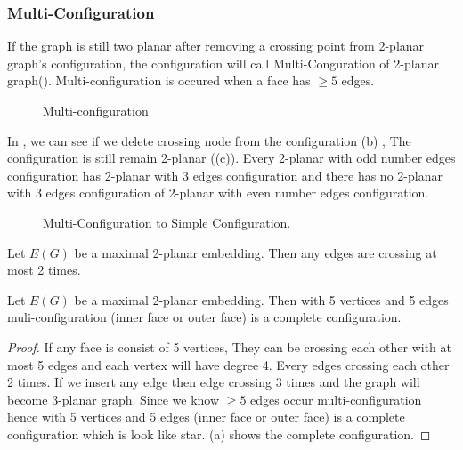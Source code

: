 \subsubsection{Multi-Configuration}
If the graph is still two planar after removing a crossing point from 2-planar graph's configuration, the configuration will call Multi-Conguration of 2-planar graph(). Multi-configuration is occured when a face has $\geq 5$ edges.

\begin{figure}[!tb]
\centering
\resizebox{100mm}{!}{}
\caption{Multi-configuration}
\label{fig:multiconfiguration}
\end{figure}

In  , we can see if we delete crossing node from the configuration (b) , The configuration is still remain 2-planar ((c)). 
Every 2-planar with odd number edges configuration has 2-planar with 3 edges configuration and there has no 2-planar with 3 edges configuration of 2-planar with even number edges configuration.
\begin{figure}[!tb]
\centering
\resizebox{100mm}{!}{}
\caption{Multi-Configuration to Simple Configuration.}
\label{fig:starmulti}
\end{figure}


\begin{lemma}

Let $E(G)$ be a maximal 2-planar embedding. Then any edges are crossing at most 2 times. 

\end{lemma}




\begin{lemma}

Let $E(G)$ be a maximal 2-planar embedding. Then with 5 vertices and 5 edges muli-configuration (inner face or outer face) is a complete configuration. 

\end{lemma}

\begin{proof}

If any face is consist of 5 vertices, They can be crossing each other with at most 5 edges and each vertex will have degree 4. Every edges crossing each other 2 times. If we insert any edge then edge crossing 3 times and the graph will become 3-planar graph. Since we know $\geq 5$ edges occur multi-configuration hence with 5 vertices and 5 edges (inner face or outer face) is a complete configuration which is look like star. (a) shows the complete configuration.
\end{proof}

